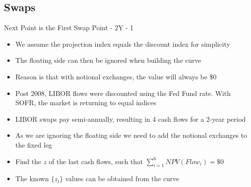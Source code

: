 \documentclass[handout, aspectratio=169]{beamer}
\begin{document}
\subsection{Swaps}
\begin{frame}{Next Point is the First Swap Point - 2Y - 1}
	\begin{itemize}
		\item We assume the projection index equals the discount index for simplicity
 		\item The floating side can then be ignored when building the curve
		\item Reason is that with notional exchanges, the value will always be \$0
		\item Post 2008, LIBOR flows were discounted using the Fed Fund rate. With SOFR, the market is returning to equal indices
		\item LIBOR swaps pay semi-annually, resulting in 4 cash flows for a 2-year period
		\item As we are ignoring the floating side we need to add the notional exchanges to the fixed leg
		\item Find the $z$ of the last cash flows, such that $\sum_{i=1}^{6} NPV(Flow_i) = \$0$
		\item The known $\{z_i\}$ values can be obtained from the curve
	\end{itemize}
\end{frame}
			
\end{document}
